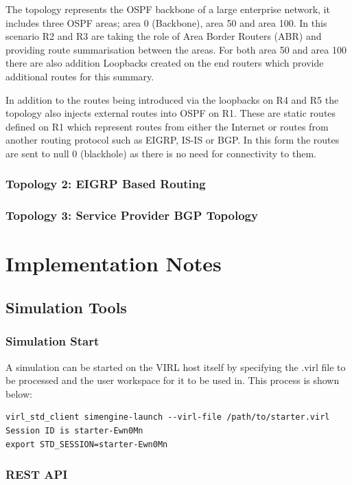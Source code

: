 \documentclass[11pt]{report}
\begin{document}
The topology represents the OSPF backbone of a large enterprise network, it includes three OSPF areas; area 0 (Backbone), area 50 and area 100. In this scenario R2 and R3 are taking the role of Area Border Routers (ABR) and providing route summarisation between the areas. For both area 50 and area 100 there are also addition Loopbacks created on the end routers which provide additional routes for this summary.

In addition to the routes being introduced via the loopbacks on R4 and R5 the topology also injects external routes into OSPF on R1. These are static routes defined on R1 which represent routes from either the Internet or routes from another routing protocol such as EIGRP, IS-IS or BGP. In this form the routes are sent to null 0 (blackhole) as there is no need for connectivity to them.

\subsection{Topology 2: EIGRP Based Routing}

\subsection{Topology 3: Service Provider BGP Topology}

\chapter*{Implementation Notes}

\section*{Simulation Tools}

\subsection*{Simulation Start}

A simulation can be started on the VIRL host itself by specifying the .virl file to be processed and the user workspace for it to be used in. This process is shown below:

\begin{lstlisting}
virl_std_client simengine-launch --virl-file /path/to/starter.virl
Session ID is starter-Ewn0Mn
export STD_SESSION=starter-Ewn0Mn
\end{lstlisting}

\subsection*{REST API}
\end{document}
